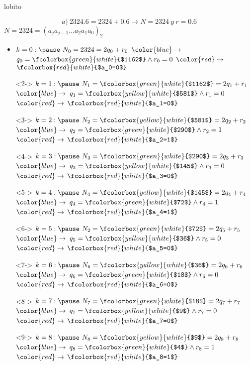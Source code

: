 \documentclass[8pt]{beamer}
\begin{document}
	lobito
	\begin{frame}
		$$a) \ 2324.6=2324+0.6 \rightarrow N=2324 \ y \ r=0.6$$\pause
		\centering$N = 2324=(a_ja_{j-1}...a_2a_1a_0)_2$\pause
		\begin{itemize}
			\item $k=0 : \pause \ N_0 = 2324=2q_0+r_0$ \pause $\color{blue}\rightarrow$ $ q_0=\fcolorbox{green}{white}{$1162$}  \wedge  r_0=0$ \pause $\color{red}\rightarrow$  $\fcolorbox{red}{white}{$a_0=0$}$ 
			\item[]<2->  $k=1 : \pause \ N_1 = \fcolorbox{green}{white}{$1162$}=2q_1+r_1$ \pause $\color{blue}\rightarrow$ $ q_1=\fcolorbox{yellow}{white}{$581$}  \wedge  r_1=0$ \pause $\color{red}\rightarrow$  $\fcolorbox{red}{white}{$a_1=0$}$
			\item[]<3->  $k=2 : \pause \ N_2 = \fcolorbox{yellow}{white}{$581$}=2q_2+r_2$ \pause $\color{blue}\rightarrow$ $ q_2=\fcolorbox{green}{white}{$290$}  \wedge  r_2=1$ \pause $\color{red}\rightarrow$  $\fcolorbox{red}{white}{$a_2=1$}$
			\item[]<4-> $k=3 : \pause \ N_3 = \fcolorbox{green}{white}{$290$}=2q_3+r_3$ \pause $\color{blue}\rightarrow$ $ q_3=\fcolorbox{yellow}{white}{$145$}  \wedge  r_3=0$ \pause $\color{red}\rightarrow$  $\fcolorbox{red}{white}{$a_3=0$}$
			\item[]<5->  $k=4 : \pause \ N_4 = \fcolorbox{yellow}{white}{$145$}=2q_4+r_4$ \pause $\color{blue}\rightarrow$ $ q_4=\fcolorbox{green}{white}{$72$}  \wedge  r_4=1$ \pause $\color{red}\rightarrow$  $\fcolorbox{red}{white}{$a_4=1$}$
			\item[]<6->  $k=5 : \pause \ N_2 = \fcolorbox{green}{white}{$72$}=2q_5+r_5$ \pause $\color{blue}\rightarrow$ $ q_5=\fcolorbox{yellow}{white}{$36$}  \wedge  r_5=0$ \pause $\color{red}\rightarrow$  $\fcolorbox{red}{white}{$a_5=0$}$
			\item[]<7-> $k=6 : \pause \ N_6 = \fcolorbox{yellow}{white}{$36$}=2q_6+r_6$ \pause $\color{blue}\rightarrow$ $ q_6=\fcolorbox{green}{white}{$18$}  \wedge  r_6=0$ \pause $\color{red}\rightarrow$  $\fcolorbox{red}{white}{$a_6=0$}$
			\item[]<8->  $k=7 : \pause \ N_7 = \fcolorbox{green}{white}{$18$}=2q_7+r_7$ \pause $\color{blue}\rightarrow$ $ q_7=\fcolorbox{yellow}{white}{$9$}  \wedge  r_7=0$ \pause $\color{red}\rightarrow$  $\fcolorbox{red}{white}{$a_7=0$}$
			\item[]<9-> $k=8 : \pause \ N_8 = \fcolorbox{yellow}{white}{$9$}=2q_8+r_8$ \pause $\color{blue}\rightarrow$ $ q_8=\fcolorbox{green}{white}{$4$}  \wedge  r_8=1$ \pause $\color{red}\rightarrow$  $\fcolorbox{red}{white}{$a_8=1$}$

\end{itemize}
\end{frame}
\end{document}
